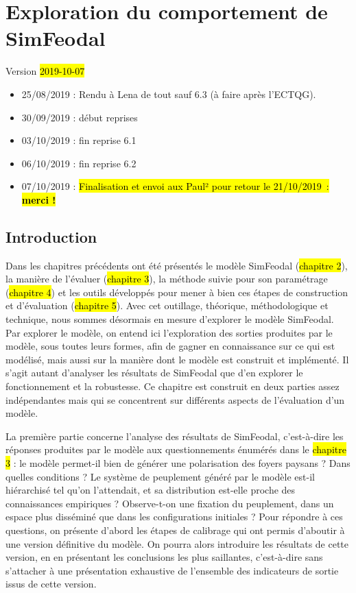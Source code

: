 \chapter{Exploration du comportement de SimFeodal}
\label{chap:chap6}
\begin{center}
	{\large Version \hl{2019-10-07}}
\end{center}

\begin{itemize}
	\item 25/08/2019 : Rendu à Lena de tout sauf 6.3 (à faire après l'ECTQG).
	\item 30/09/2019 : début reprises
	\item 03/10/2019 : fin reprise 6.1
	\item 06/10/2019 : fin reprise 6.2
	\item 07/10/2019 : \hl{Finalisation et envoi aux Paul² pour retour le 21/10/2019~: \textbf{merci !}}
\end{itemize} 

\minitoc

\clearpage
\section*{Introduction}

Dans les chapitres précédents ont été présentés le modèle SimFeodal (\hl{chapitre 2}), la manière de l'évaluer (\hl{chapitre 3}), la méthode suivie pour son paramétrage (\hl{chapitre 4}) et les outils développés pour mener à bien ces étapes de construction et d'évaluation (\hl{chapitre 5}).
Avec cet outillage, théorique, méthodologique et technique, nous sommes désormais en mesure d'explorer le modèle SimFeodal.
Par \og explorer le modèle\fg{}, on entend ici l'exploration des sorties produites par le modèle, sous toutes leurs formes, afin de gagner en connaissance sur ce qui est modélisé, mais aussi sur la manière dont le modèle est construit et implémenté.
Il s'agit autant d'analyser les \og résultats\fg{} de SimFeodal que d'en explorer le fonctionnement et la robustesse.
Ce chapitre est construit en deux parties assez indépendantes mais qui se concentrent sur différents aspects de l'évaluation d'un modèle.

La première partie concerne l'analyse des \og résultats\fg{} de SimFeodal, c'est-à-dire les réponses produites par le modèle aux questionnements énumérés dans le \hl{chapitre 3} :
le modèle permet-il bien de générer une polarisation des foyers paysans ? Dans quelles conditions ?
Le système de peuplement généré par le modèle est-il hiérarchisé tel qu'on l'attendait, et sa distribution est-elle proche des connaissances empiriques ?
Observe-t-on une fixation du peuplement, dans un espace plus disséminé que dans les configurations initiales ?
Pour répondre à ces questions, on présente d'abord les étapes de calibrage qui ont permis d'aboutir à une version \og définitive\fg{} du modèle.
On pourra alors introduire les résultats de cette version, en en présentant les conclusions les plus saillantes, c'est-à-dire sans s'attacher à une présentation exhaustive de l'ensemble des indicateurs de sortie issus de cette version.

